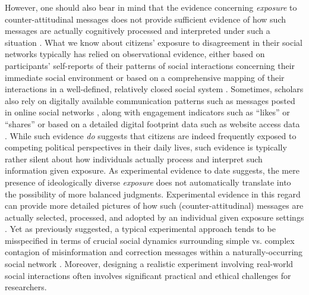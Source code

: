 \documentclass[man, 12pt, a4paper, noextraspace]{apa6}
\begin{document}
    However, one should also bear in mind that the evidence concerning \emph{exposure} to counter-attitudinal messages does not provide sufficient evidence of how such messages are actually cognitively processed and interpreted under such a situation \parencites[e.g., see "engagement echo chamber" discussion in][]{Garrett2017distraction}[also, see][]{nyhan2017taking}. What we know about citizens' exposure to disagreement in their social networks typically has relied on observational evidence, either based on participants' self-reports of their patterns of social interactions concerning their immediate social environment \parencite{huckfeldt2004disagreement} or based on a comprehensive mapping of their interactions in a well-defined, relatively closed social system \parencite[e.g.,][]{song2015uncovering, lazer2010coevolution}. Sometimes, scholars also rely on digitally available communication patterns such as messages posted in online social networks \parencite[e.g.,][]{margolin2017}, along with engagement indicators such as \enquote{likes} or \enquote{shares} \parencite[e.g.,][]{Bakshy1130} or based on a detailed digital footprint data such as website access data \parencite[e.g.,][]{guess2018selective}. While such evidence \emph{do} suggests that citizens are indeed frequently exposed to competing political perspectives in their daily lives, such evidence is typically rather silent about how individuals actually process and interpret such information given exposure. As experimental evidence to date suggests, the mere presence of ideologically diverse \emph{exposure} does not automatically translate into the possibility of more balanced judgments. Experimental evidence in this regard can provide more detailed pictures of how such (counter-attitudinal) messages are actually selected, processed, and adopted by an individual given exposure settings \parencite[e.g., ][]{messing2014selective, nyhan2017taking, Wood2018}. Yet as previously suggested, a typical experimental approach tends to be misspecified in terms of crucial social dynamics surrounding simple vs. complex contagion of misinformation and correction messages within a naturally-occurring social network \parencite{margolin2017, Centola2010Sience}. Moreover, designing a realistic experiment involving real-world social interactions often involves significant practical \parencite[e.g.,][]{bond_61million} and ethical challenges \parencite[e.g.,][]{Kramer8788} for researchers.       
    
\end{document}
